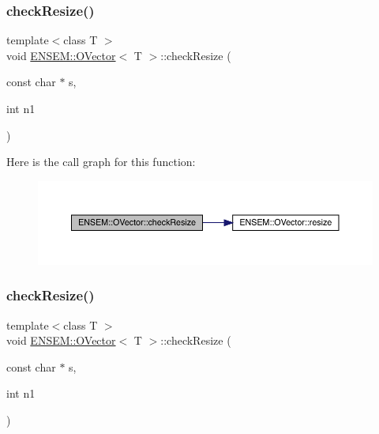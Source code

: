 \subsubsection{\texorpdfstring{checkResize()}{checkResize()}\hspace{0.1cm}{\footnotesize\ttfamily [2/9]}}
{\footnotesize\ttfamily template$<$class T $>$ \\
void \mbox{\hyperlink{classENSEM_1_1OVector}{E\+N\+S\+E\+M\+::\+O\+Vector}}$<$ T $>$\+::check\+Resize (\begin{DoxyParamCaption}\item[{const char $\ast$}]{s,  }\item[{int}]{n1 }\end{DoxyParamCaption})\hspace{0.3cm}{\ttfamily [inline]}}

Here is the call graph for this function\+:
\nopagebreak
\begin{figure}[H]
\begin{center}
\leavevmode
\includegraphics[width=350pt]{d0/d8d/classENSEM_1_1OVector_a95545451bb9d6be83ba32ad3dc2dab42_cgraph}
\end{center}
\end{figure}
\mbox{\label{classENSEM_1_1OVector_a95545451bb9d6be83ba32ad3dc2dab42}} 
\subsubsection{\texorpdfstring{checkResize()}{checkResize()}\hspace{0.1cm}{\footnotesize\ttfamily [3/9]}}
{\footnotesize\ttfamily template$<$class T $>$ \\
void \mbox{\hyperlink{classENSEM_1_1OVector}{E\+N\+S\+E\+M\+::\+O\+Vector}}$<$ T $>$\+::check\+Resize (\begin{DoxyParamCaption}\item[{const char $\ast$}]{s,  }\item[{int}]{n1 }\end{DoxyParamCaption})\hspace{0.3cm}{\ttfamily [inline]}}


